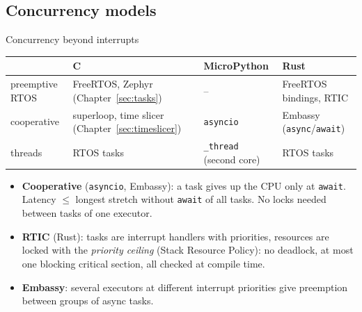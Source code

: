 \subsection{Concurrency models}
\begin{frame}{Concurrency beyond interrupts}
  \begin{center}\small
  \begin{tabular}{@{}p{}p{}p{}p{}@{}}
    \toprule
    & C & MicroPython & Rust \\
    \midrule
    preemptive RTOS & FreeRTOS, Zephyr (Chapter~\ref{sec:tasks}) & -- & FreeRTOS bindings, RTIC \\
    cooperative & superloop, time slicer (Chapter~\ref{sec:timeslicer}) & \texttt{asyncio} & Embassy (\texttt{async}/\texttt{await}) \\
    threads & RTOS tasks & \texttt{\_thread} (second core) & RTOS tasks \\
    \bottomrule
  \end{tabular}
  \end{center}
  \begin{itemize}
    \item \textbf{Cooperative} (\texttt{asyncio}, Embassy): a task gives up the CPU only at \texttt{await}. Latency $\le$ longest stretch without \texttt{await} of all tasks. No locks needed between tasks of one executor.
    \item \textbf{RTIC} (Rust): tasks are interrupt handlers with priorities, resources are locked with the \emph{priority ceiling} (Stack Resource Policy): no deadlock, at most one blocking critical section, all checked at compile time.
    \item \textbf{Embassy}: several executors at different interrupt priorities give preemption between groups of async tasks.
  \end{itemize}
\end{frame}

